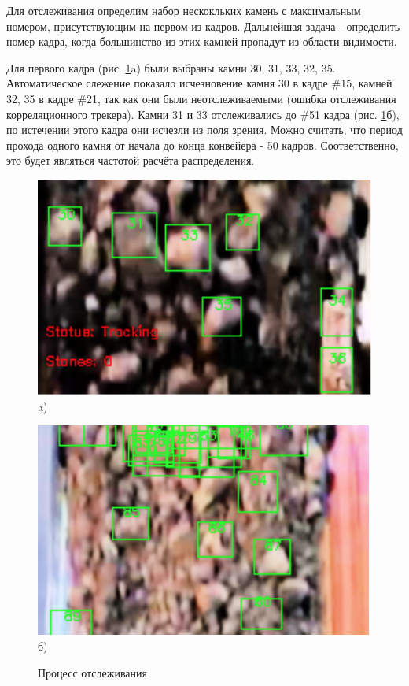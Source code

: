 \documentclass[times]{itmo-student-thesis}
\begin{document}
Для отслеживания определим набор нескокльких камень с максимальным номером, присутствующим на первом из кадров. Дальнейшая задача - определить номер кадра, когда большинство из этих камней пропадут из области видимости. 

Для первого кадра  (рис. \ref{fig:frames}a) были выбраны камни 30, 31, 33, 32, 35. Автоматическое слежение показало исчезновение камня 30 в кадре \#15, камней 32, 35 в кадре \#21, так как они были неотслеживаемыми (ошибка отслеживания корреляционного трекера). Камни 31 и 33 отслеживались до \#51 кадра (рис. \ref{fig:frames}б), по истечении этого кадра они исчезли из поля зрения. Можно считать, что период прохода одного камня от начала до конца конвейера - 50 кадров. Соответственно, это будет являться частотой расчёта распределения. 
\begin{figure}[h]
	\begin{minipage}[h]{0.49\linewidth}
		\centering
		\includegraphics[width=0.8\linewidth]{images/finaltrack1} \\ a)
	\end{minipage}
	\hfill
	\begin{minipage}[h]{0.49\linewidth}
		\centering
		\includegraphics[width=0.8\linewidth]{images/finaltrack2} \\ б)
	\end{minipage}
	\caption{Процесс отслеживания}
	\label{fig:frames}
\end{figure}
\end{document}

